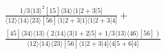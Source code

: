\documentclass[varwidth, border=5pt]{standalone}
\begin{document}
\begin{my}
$\begin{gathered}
\scriptscriptstyle\frac{1/3⟨13⟩^2[15]⟨34⟩⟨1|2+3|5]}{⟨12⟩⟨14⟩⟨23⟩[56]⟨1|2+3|1]⟨1|2+3|4]}+\\
\scriptscriptstyle\frac{[45]⟨34⟩⟨13⟩(2⟨14⟩⟨3|1+2|5]+1/3⟨13⟩⟨46⟩[56])}{⟨12⟩⟨14⟩⟨23⟩[56]⟨1|2+3|4]⟨4|5+6|4]}\phantom{+}
\end{gathered}$
\end{my}
\end{document}

